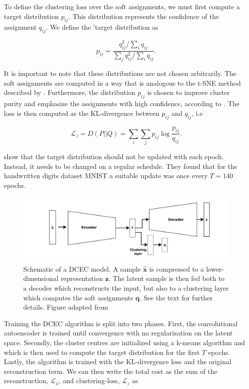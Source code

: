 To define the clustering loss over the soft assignments, we must first compute a target distribution $p_{ij}$. This distribution represents the confidence of the assignment $q_{ij}$. We define the 'target distribution as 

\begin{equation}
p_{ij} = \frac{q_{ij}^2/\sum_i q_{ij}}{\sum_j q_{ij}^2/\sum_i q_{ij}}.
\end{equation}

\noindent It is important to note that these distributions are not chosen arbitrarily. The soft assignments are computed in a way that is analogous to the t-SNE method described by \citet{VanDerMaaten2008}. Furthermore, the distribution $p_{ij}$ is chosen to improve cluster purity and emphasize the assignments with high confidence, according to \cite{Xie2016}. The loss is then computed as the KL-divergence between $p_{ij}$ and $q_{ij}$, i.e

\begin{equation}
\mathcal{L}_z = D(P ||Q ) = \sum_i \sum_j p_{ij} \log \frac{p_{ij}}{q_{ij}}.
\end{equation} 

\noindent \citet{Guo2017} show that the target distribution should not be updated with each epoch. Instead, it needs to be changed on a regular schedule. They found that for the handwritten digits dataset MNIST a suitable update was once every $T=140$ epochs. 

\begin{figure}[tb]
	\centering
	\includegraphics[width=\textwidth]{plots/dcec.pdf}
	\caption[Deep convolutional embedded clustering schematic]{Schematic of a DCEC model. A sample $\hat{\mathbf{x}}$ is compressed to a lower-dimensional representation $\mathbf{z}$. The latent sample is then fed both to a decoder which reconstructs the input, but also to a clustering layer which computes the soft assignments $\mathbf{q}$. See the text for further details. Figure adapted from \citet{Guo2017}}
	\label{fig:dcec}
\end{figure}

Training the DCEC algorithm is split into two phases. First, the convolutional autoencoder is trained until convergence with no regularization on the latent space. Secondly, the cluster centres are initialized using a k-means algorithm and which is then used to compute the target distribution for the first $T$ epochs. Lastly, the algorithm is trained with the KL-divergence loss and the original reconstruction term. We can then write the total cost as the sum of the reconstruction, $\mathcal{L}_x$, and clustering-loss, $\mathcal{L}_z$ as 

